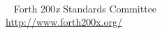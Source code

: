 \documentclass[10pt]{book}
\makeatletter
\def\includefile{}
\let\forth@include=
\renewcommand{}[1]{%
	\immediate\write\@auxout{\string\@writefile{toc}{\string\contentsfile{#1}}}%
	\gdef\includefile{#1}%
	\forth@include{#1}%
}
\newcommand{\contentsfile}[1]{}
\newcounter{savepage}
\makeatother
\begin{document}
		\setcounter{page}{\value{savepage}}
	\fi
\fi




\appendix














\pagestyle{empty}

~\newpage

~
\vfill
Forth 200\emph{x} Standards Committee \\[2ex]
\url{http://www.forth200x.org/}
\end{document}
